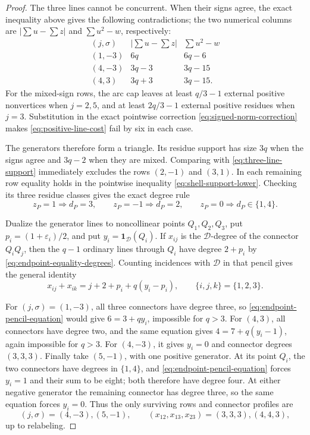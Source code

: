 \begin{proof}
The three lines cannot be concurrent.  When their signs agree, the exact
inequality above gives the following contradictions; the two numerical
columns are \(\left|\sum u-\sum z\right|\) and
\(\sum u^2-w\), respectively:
\[
\begin{array}{c|c|c}
 (j,\sigma)&\left|\sum u-\sum z\right|&\sum u^2-w\\ \hline
 (1,-3)&6q&6q-6\\
 (4,-3)&3q-3&3q-15\\
 (4,3)&3q+3&3q-15.
\end{array}
\]
For the mixed-sign rows, the arc cap leaves at least \(q/3-1\) external
positive nonvertices when \(j=2,5\), and at least \(2q/3-1\) external
positive residues when \(j=3\).  Substitution in the exact pointwise
correction \eqref{eq:signed-norm-correction} makes
\eqref{eq:positive-line-cost} fail by six in each case.

The generators therefore form a triangle.  Its residue support has size
\(3q\) when the signs agree and \(3q-2\) when they are mixed.  Comparing
with \eqref{eq:three-line-support} immediately excludes the rows
\((2,-1)\) and \((3,1)\).  In each remaining row equality holds in the
pointwise inequality \eqref{eq:shell-support-lower}.  Checking its three
residue classes gives the exact degree rule
\begin{equation}\label{eq:endpoint-equality-degrees}
 z_P=1\Longrightarrow d_P=3,\qquad
 z_P=-1\Longrightarrow d_P=2,\qquad
 z_P=0\Longrightarrow d_P\in\{1,4\}.
\end{equation}

Dualize the generator lines to noncollinear points \(Q_1,Q_2,Q_3\), put
\(p_i=(1+\varepsilon_i)/2\), and put
\(y_i=\mathbf1_{\mathcal D}(Q_i)\).  If \(x_{ij}\) is the
\(\mathcal D\)-degree of the connector \(Q_iQ_j\), then the \(q-1\)
ordinary lines through \(Q_i\) have degree \(2+p_i\) by
\eqref{eq:endpoint-equality-degrees}.  Counting incidences with
\(\mathcal D\) in that pencil gives the general identity
\begin{equation}\label{eq:endpoint-pencil-equation}
 x_{ij}+x_{ik}=j+2+p_i+q(y_i-p_i),
 \qquad \{i,j,k\}=\{1,2,3\}.
\end{equation}

For \((j,\sigma)=(1,-3)\), all three connectors have degree three, so
\eqref{eq:endpoint-pencil-equation} would give \(6=3+qy_i\), impossible
for \(q>3\).  For \((4,3)\), all connectors have degree two, and the same
equation gives \(4=7+q(y_i-1)\), again impossible for \(q>3\).
For \((4,-3)\), it gives \(y_i=0\) and connector degrees
\((3,3,3)\).  Finally take \((5,-1)\), with one positive generator.  At
its point \(Q_i\), the two connectors have degrees in \(\{1,4\}\), and
\eqref{eq:endpoint-pencil-equation} forces \(y_i=1\) and their sum to be
eight; both therefore have degree four.  At either negative generator the
remaining connector has degree three, so the same equation forces \(y_i=0\).
Thus the only surviving rows and connector profiles are
\[
 (j,\sigma)=(4,-3),(5,-1),\qquad
 (x_{12},x_{13},x_{23})=(3,3,3),(4,4,3),
\]
up to relabeling.


\end{proof}

